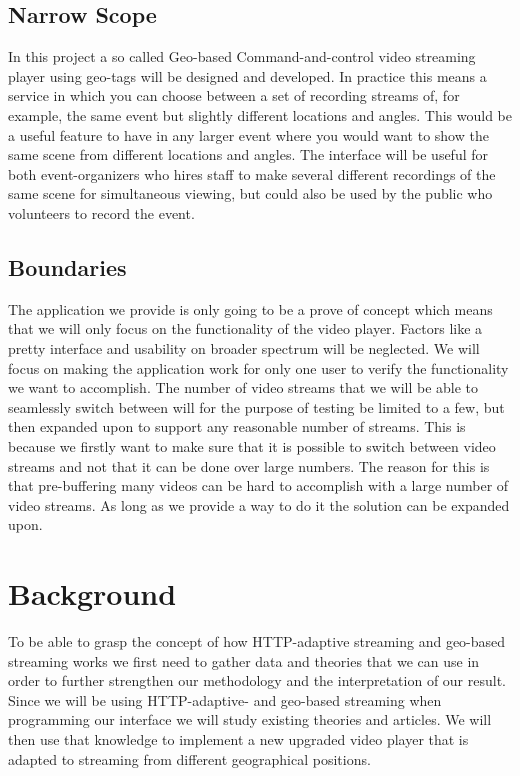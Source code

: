 \documentclass[9pt,a4paper]{acmproc}
\begin{document}
\subsection{Narrow Scope}
In this project a so called Geo-based Command-and-control video streaming player using geo-tags will be designed and developed. In practice this means a service in which you can choose between a set of recording streams of, for example, the same event but slightly different locations and angles. This would be a useful feature to have in any larger event where you would want to show the same scene from different locations and angles. The interface will be useful for both event-organizers who hires staff to make several different recordings of the same scene for simultaneous viewing, but could also be used by the public who volunteers to record the event.

\subsection{Boundaries}
The application we provide is only going to be a prove of concept which means that we will only focus on the functionality of the video player. Factors like a pretty interface and usability on broader spectrum will be neglected. We will focus on making the application work for only one user to verify the functionality we want to accomplish. The number of video streams that we will be able to seamlessly switch between will for the purpose of testing be limited to a few, but then expanded upon to support any reasonable number of streams. This is because we firstly want to make sure that it is possible to switch between video streams and not that it can be done over large numbers. The reason for this is that pre-buffering many videos can be hard to accomplish with a large number of video streams. As long as we provide a way to do it the solution can be expanded upon.


\section{Background}
To be able to grasp the concept of how HTTP-adaptive streaming and geo-based streaming works we first need to gather data and theories that we can use in order to further strengthen our methodology and the interpretation of our result. Since we will be using HTTP-adaptive- and geo-based streaming when programming our interface we will study existing theories and articles. We will then use that knowledge to implement a new upgraded video player that is adapted to streaming from different geographical positions.
\end{document}

